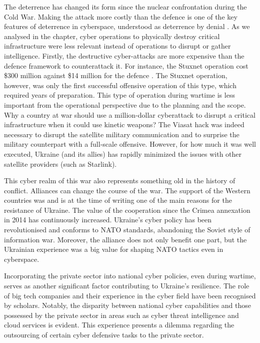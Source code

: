 The deterrence has changed its form since the nuclear confrontation during the Cold War. Making the attack more costly than the defence is one of the key features of deterrence in cyberspace, understood as deterrence by denial \autocite{nye_2017_deterrence}. As we analysed in the chapter, cyber operations to physically destroy critical infrastructure were less relevant instead of operations to disrupt or gather intelligence. Firstly, the destructive cyber-attacks are more expensive than the defence framework to counterattack it. For instance, the Stuxnet operation cost \$300 million against \$14 million for the defence \autocite{slayton_2017_what}. The Stuxnet operation, however, was only the first successful offensive operation of this type, which required years of preparation. This type of operation during wartime is less important from the operational perspective due to the planning and the scope. Why a country at war should use a million-dollar cyberattack to disrupt a critical infrastructure when it could use kinetic weapons? The Viasat hack was indeed necessary to disrupt the satellite military communication and to surprise the military counterpart with a full-scale offensive. However, for how much it was well executed, Ukraine (and its allies) has rapidly minimized the issues with other satellite providers (such as Starlink). 

This cyber realm of this war also represents something old in the history of conflict. Alliances can change the course of the war. The support of the Western countries was and is at the time of writing one of the main reasons for the resistance of Ukraine. The value of the cooperation since the Crimea annexation in 2014 has continuously increased. Ukraine's cyber policy has been revolutionised and conforms to NATO standards, abandoning the Soviet style of information war. Moreover, the alliance does not only benefit one part, but the Ukrainian experience was a big value for shaping NATO tactics even in cyberspace. 

Incorporating the private sector into national cyber policies, even during wartime, serves as another significant factor contributing to Ukraine's resilience. The role of big tech companies and their experience in the cyber field have been recognised by scholars. Notably, the disparity between national cyber capabilities and those possessed by the private sector in areas such as cyber threat intelligence and cloud services is evident. This experience presents a dilemma regarding the outsourcing of certain cyber defensive tasks to the private sector.

